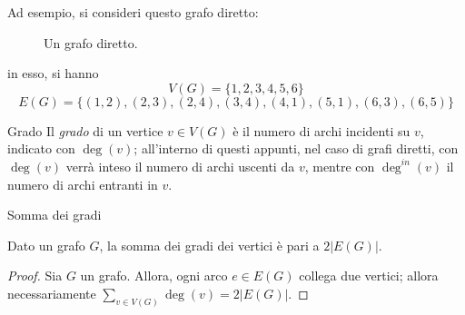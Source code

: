 \documentclass[a4paper, 12pt]{report}
\begin{document}
    \begin{example}
        Ad esempio, si consideri questo grafo diretto:

        \begin{figure}[H]
            \centering
            \caption{Un grafo diretto.}
        \end{figure}

        in esso, si hanno $$V(G) = \{1, 2, 3, 4, 5, 6\}$$ $$E(G) = \{(1, 2), (2, 3), (2, 4), (3, 4), (4, 1), (5, 1), (6, 3), (6, 5)\}$$
    \end{example}

    \begin{frameddefn}{Grado}
        Il \textit{grado} di un vertice $v \in V(G)$ è il numero di archi incidenti su $v$, indicato con $\deg(v)$; all'interno di questi appunti, nel caso di grafi diretti, con $\deg(v)$ verrà inteso il numero di archi uscenti da $v$, mentre con $\deg^{in}(v)$ il numero di archi entranti in $v$.
    \end{frameddefn}

    \begin{framedlem}{Somma dei gradi}
        \label{Somma dei gradi}

        Dato un grafo $G$, la somma dei gradi dei vertici è pari a $2 |E(G)|$.
    \end{framedlem}

    \begin{proof}
        Sia $G$ un grafo. Allora, ogni arco $e \in E(G)$ collega due vertici; allora necessariamente $\displaystyle \sum_{v \in V(G)}{\deg(v)} = 2 |E(G)|$.
    \end{proof}
\end{document}
